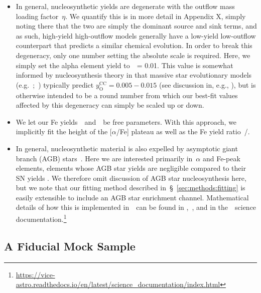 \documentclass[ms.tex]{subfiles}
\begin{document}
\begin{itemize}

	\item In general, nucleosynthetic yields are degenerate with the outflow
	mass loading factor~$\eta$.
	We quantify this is in more detail in Appendix X, simply noting there that
	the two are simply the dominant source and sink terms, and as such,
	high-yield high-outflow models generally have a low-yield low-outflow
	counterpart that predicts a similar chemical evolution.
	In order to break this degeneracy, only one number setting the absolute
	scale is required.
	Here, we simply set the alpha element yield to~\yacc~= 0.01.
	This value is somewhat informed by nucleosynthesis theory in that
	massive star evolutionary models (e.g.~\citealp{Sukhbold2016,
	Limongi2018};~\citealp*{Nomoto2013}) typically predict
	$y_\text{O}^\text{CC} = 0.005 - 0.015$ (see discussion in, e.g.,
	\citealp{Weinberg2017, Johnson2020}), but is otherwise intended to be a
	round number from which our best-fit values affected by this degeneracy can
	simply be scaled up or down.

	\item We let our Fe yields~\yfecc~and~\yfeia~be free parameters.
	With this approach, we implicitly fit the height of the [$\alpha$/Fe]
	plateau as well as the Fe yield ratio~\yfecc/\yfeia.

	\item In general, nucleosynthetic material is also expelled by asymptotic
	giant branch (AGB) stars~\citep[e.g.][]{Cristallo2011, Cristallo2015,
	Ventura2013, Karakas2016, Karakas2018}.
	Here we are interested primarily in~$\alpha$ and Fe-peak elements, elements
	whose AGB star yields are negligible compared to their SN yields
	\citep[e.g.][]{Johnson2019}.
	We therefore omit discussion of AGB star nucleosynthesis here, but we note
	that our fitting method described in~\S~\ref{sec:methods:fitting} is easily
	extensible to include an AGB star enrichment channel.
	Mathematical details of how this is implemented in~\vice~can be found in
	\citet{Johnson2020},~\citet{Johnson2022}, and in the~\vice~science
	documentation.\footnote{
		\url{https://vice-astro.readthedocs.io/en/latest/science_documentation/index.html}
	}

\end{itemize}

\subsection{A Fiducial Mock Sample}
\label{sec:methods:fiducialmock}
\end{document}
